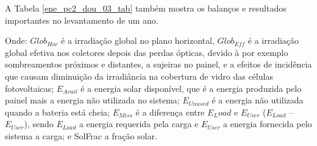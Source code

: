 A Tabela \ref{ene_pc2_dou_03_tab} também mostra os balanços e resultados importantes no levantamento de um ano.

\begin{table}[H]
\caption{Balanços e resultados principais. Fonte do Autor}
\label{ene_pc2_dou_03_tab}
\end{table}
 
	Onde: $Glob_{Hor}$ é a irradiação global no plano horizontal, $Glob_{Eff}$ é a irradiação global efetiva nos coletores depois das perdas ópticas, devido à por exemplo sombreamentos próximos e distantes, a sujeiras no painel, e a efeitos de incidência que causam diminuição da irradiância na cobertura de vidro das células fotovoltaicas; $E_{Avail}$ é a energia solar disponível, que é a energia produzida pelo painel mais a energia não utilizada no sistema; $E_{Unused}$ é a energia não utilizada quando a bateria está cheia;  $E_{Miss}$ é a diferença entre $E_Load$ e $E_{User}$ ($E_{Load}$ – $E_{User}$), sendo $E_{Load}$ a energia requerida pela carga e $E_{User}$ a energia fornecida pelo sistema a carga; e SolFrac a fração solar.
	
